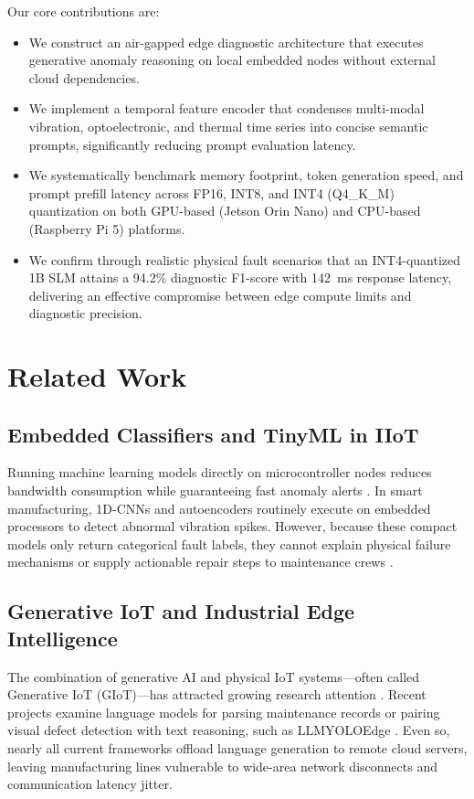 \documentclass[conference]{IEEEtran}
\begin{document}
Our core contributions are:
\begin{itemize}
    \item We construct an air-gapped edge diagnostic architecture that executes generative anomaly reasoning on local embedded nodes without external cloud dependencies.
    \item We implement a temporal feature encoder that condenses multi-modal vibration, optoelectronic, and thermal time series into concise semantic prompts, significantly reducing prompt evaluation latency.
    \item We systematically benchmark memory footprint, token generation speed, and prompt prefill latency across FP16, INT8, and INT4 (Q4\_K\_M) quantization on both GPU-based (Jetson Orin Nano) and CPU-based (Raspberry Pi 5) platforms.
    \item We confirm through realistic physical fault scenarios that an INT4-quantized 1B SLM attains a 94.2\% diagnostic F1-score with 142~ms response latency, delivering an effective compromise between edge compute limits and diagnostic precision.
\end{itemize}

\section{Related Work}

\subsection{Embedded Classifiers and TinyML in IIoT}
Running machine learning models directly on microcontroller nodes reduces bandwidth consumption while guaranteeing fast anomaly alerts \cite{zhou2019edge}. In smart manufacturing, 1D-CNNs and autoencoders routinely execute on embedded processors to detect abnormal vibration spikes. However, because these compact models only return categorical fault labels, they cannot explain physical failure mechanisms or supply actionable repair steps to maintenance crews \cite{zhou2019edge}.

\subsection{Generative IoT and Industrial Edge Intelligence}
The combination of generative AI and physical IoT systems---often called Generative IoT (GIoT)---has attracted growing research attention \cite{firouzi2026generative, nam2026survey}. Recent projects examine language models for parsing maintenance records or pairing visual defect detection with text reasoning, such as LLMYOLOEdge \cite{ray2025llmyoloedge}. Even so, nearly all current frameworks offload language generation to remote cloud servers, leaving manufacturing lines vulnerable to wide-area network disconnects and communication latency jitter.
\end{document}

